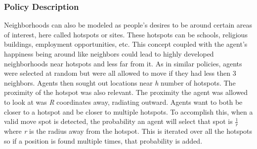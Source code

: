 \documentclass[11pt]{article}
\begin{document}
        \subsubsection{Policy Description}
	Neighborhoods can also be modeled as people’s desires to be around certain areas of interest, here called hotspots or sites. These hotspots can be schools, religious buildings, employment opportunities, etc. This concept coupled with the agent’s happiness being around like neighbors could lead to highly developed neighborhoods near hotspots and less far from it. As in similar policies, agents were selected at random but were all allowed to move if they had less then 3 neighbors. Agents then sought out locations near \textit{h} number of hotspots. The proximity of the hotspot was also relevant. The proximity the agent was allowed to look at was \textit{R} coordinates away, radiating outward. Agents want to both be closer to a hotspot and be closer to multiple hotspots. To accomplish this, when a valid move spot is detected, the probability an agent will select that spot is $\frac{1}{r}$ where \textit{r} is the radius away from the hotspot. This is iterated over all the hotspots so if a position is found multiple times, that probability is added.
\end{document}
